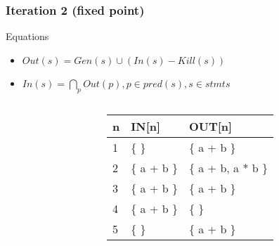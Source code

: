 \begin{frame}[fragile, t]
 \frametitle{Iteration 2 (fixed point)} 

\begin{center}
\begin{scriptsize}
\begin{minipage}{8cm}
    \begin{block}{Equations}
    \begin{itemize}
        \item $Out(s) = Gen(s) \cup (In(s) - Kill(s))$  
	    \item $In(s) = \bigcap_p Out(p), p \in pred(s), s \in stmts$
    \end{itemize}
    \end{block}
\end{minipage}
\end{scriptsize}
\end{center}

\begin{columns}[T]
\begin{column}[T]{.5\textwidth}
    \vspace{0pt}
    
    \end{column}
    \begin{column}[T]{.5\textwidth}
\vspace{30pt}    
	\begin{scriptsize}
	   \begin{table}[]
\begin{tabular}{|l|l|l|}
\hline
n & IN{[}n{]} & OUT{[}n{]} \\ \hline
1  &  \{ \}        & \{ a + b \}        \pause \\ \hline
2  &  \{ a + b \}  & \{ a + b, a * b \} \pause \\ \hline
3  &  \{ a + b \}  & \{ a + b \}        \pause \\ \hline
4  &  \{ a + b \}  & \{ \}              \pause \\ \hline
5  &  \{ \}        & \{ a + b \}        \\ \hline
\end{tabular}
\end{table}   
	\end{scriptsize}
	\end{column}
    
\end{columns}

\end{frame}
